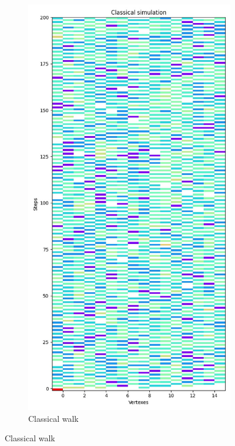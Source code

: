 \begin{figure}[H]
  \centering
  \begin{subfigure}{.45\linewidth}
    \centering
    \includegraphics[width=\linewidth]{./figures/results/hypercube/classical.jpg}
    \caption{Classical walk}

\end{subfigure}
\end{figure}
